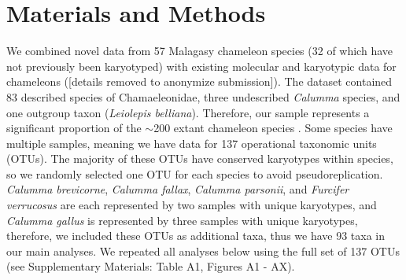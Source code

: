 \documentclass[a4paper, 12pt]{article}
\begin{document}
\section{Materials and Methods}

We combined novel data from 57 Malagasy chameleon species (32 of which have not previously been karyotyped) with existing molecular and karyotypic data for chameleons ([details removed to anonymize submission]). 
The dataset contained 83 described species of Chamaeleonidae, three undescribed \textit{Calumma} species, and one outgroup taxon (\textit{Leiolepis belliana}). 
Therefore, our sample represents a significant proportion of the $\sim$200 extant chameleon species \citep{uetz2022}. 
Some species have multiple samples, meaning we have data for 137 operational taxonomic units (OTUs). 
The majority of these OTUs have conserved karyotypes within species, so we randomly selected one OTU for each species to avoid pseudoreplication.
\textit{Calumma brevicorne}, \textit{Calumma fallax}, \textit{Calumma parsonii}, and \textit{Furcifer verrucosus} are each represented by two samples with unique karyotypes, and \textit{Calumma gallus} is represented by three samples with unique karyotypes, therefore, we included these OTUs as additional taxa, thus we have 93 taxa in our main analyses. 
We repeated all analyses below using the full set of 137 OTUs (see Supplementary Materials: Table A1, Figures A1 - AX).
\end{document}
